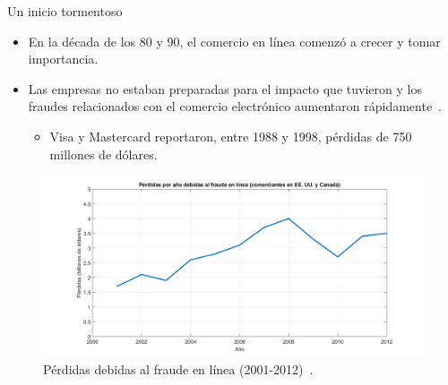%
%
%


\begin{frame}{Un inicio tormentoso}
  {
    \begin{itemize}
      \item En la década de los 80 y 90, el comercio en línea comenzó a crecer y
        tomar importancia.
      \item Las empresas no estaban preparadas para el impacto que tuvieron y
        los fraudes relacionados con el comercio electrónico aumentaron
        rápidamente~\cite{search_security}.
        \begin{itemize}
          \item Visa y Mastercard reportaron, entre 1988 y 1998, pérdidas de 750
            millones de dólares.
        \end{itemize}
    \end{itemize}
  }

  {
    \begin{figure}[H]
      \begin{center}
        \includegraphics[width=1.0\linewidth]
          {../../diagramas_comunes/intro/perdidas_fraude}
        \caption{Pérdidas debidas al fraude en línea
          (2001-2012)~\cite{wallethub}.}
      \end{center}
    \end{figure}
  }
\end{frame}

